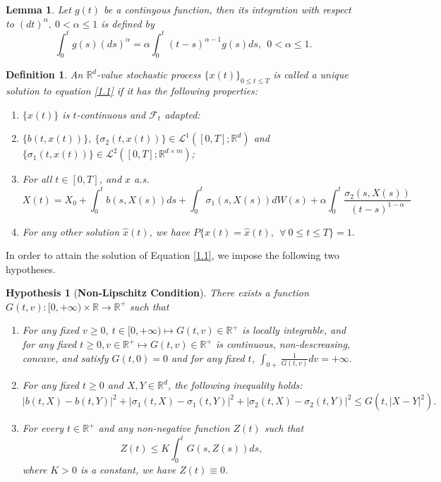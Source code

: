 \documentclass[a4 paper, 12pt]{report}
\theoremstyle{plain}
\newtheorem{lemma}[theorem]{\textbf{Lemma}}
\newtheorem{hypothesis}[theorem]{\textbf{Hypothesis}}
\newtheorem{definition}[theorem]{\textbf{Definition}}
\begin{document}
\begin{lemma}\label{l2.1}
Let $g(t)$ be a continyous function, then its integration with respect to $(dt)^\alpha,~0<\alpha\leq 1$ is defined by
$$
\int_0^tg(s)(ds)^\alpha = \alpha\int_0^t(t-s)^{\alpha - 1}g(s)ds,~~0<\alpha\leq 1.
$$
\end{lemma}
\begin{definition}\label{d2.2}
\normalfont
An $\mathbb{R}^d$-value stochastic process $\{x(t)\}_{0\leq t\leq T}$ is called a unique solution to equation \eqref{1.1} if it has the following properties:

\begin{enumerate}
\item[(i)] $\{x(t)\}$ is $t$-continuous and $\mathcal{F}_t$ adapted:
\item[(ii)] $\{b(t,x(t))\},~\{\sigma_2(t,x(t))\}\in\mathcal{L}^1([0,T];\mathbb{R}^d)$ and $\{\sigma_1(t,x(t))\}\in\mathcal{L}^2([0,T];\mathbb{R}^{d\times m})$;
\item[(iii)] For all $t\in[0,T]$, and $x$ a.s.
\begin{equation}\label{2.1}
X(t) = X_0+\int_0^tb(s,X(s))ds+\int_0^t\sigma_1(s,X(s))dW(s)+\alpha\int_0^t\frac{\sigma_2(s,X(s))}{(t-s)^{1-\alpha}}
\end{equation}
\item[(iv)] For any other solution $\hat{x}(t)$, we have $P\{x(t) = \hat{x}(t),~~\forall~0\leq t\leq T\} = 1.$
\end{enumerate}
\end{definition}



In order to attain the solution of Equation \eqref{1.1}, we impose the following two hypotheses.

\begin{hypothesis}[\textbf{Non-Lipschitz Condition}]\label{hypo1}
\normalfont
There exists a function $G(t,v) : [0,+\infty)\times \mathbb{R}\rightarrow\mathbb{R}^+$ such that 
\begin{enumerate}
\item[(a)] For any fixed $v\geq 0,~t\in[0,+\infty)\mapsto G(t,v)\in\mathbb{R}^+$ is locally integrable, and for any fixed $t\geq 0,v\in\mathbb{R}^+\mapsto G(t,v)\in\mathbb{R}^+$ is continuous, non-descreasing, concave, and satisfy $G(t,0) = 0$ and for any fixed $t$, $\int_{0+}\frac{1}{G(t,v)}dv = +\infty.$ 
\item[(b)] For any fixed $t\geq 0$ and $X,Y\in\mathbb{R}^d$, the following inequality holds:
$$
|b(t,X) - b(t,Y)|^2 + |\sigma_1(t,X) - \sigma_1(t,Y)|^2+|\sigma_2(t,X) - \sigma_2(t,Y)|^2\leq  G(t,|X-Y|^2).
$$
\item[(c)] For every $t\in\mathbb{R}^+$ and any non-negative function $Z(t)$ such that
$$
Z(t)\leq K\int_0^t G(s,Z(s))ds,
$$
where $K>0$ is a constant, we have $Z(t)\equiv 0$.
\end{enumerate}
\end{hypothesis}
\end{document}

